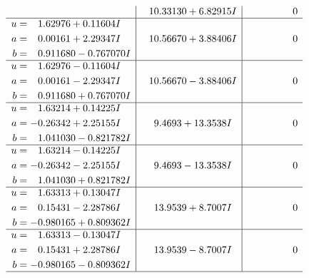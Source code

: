 \documentclass[1p]{elsarticle_modified}
\theoremstyle{definition}
\begin{document}
$$\begin{array}{c|c|c}
 & \phantom{-}10.33130 + 6.82915 I & \phantom{-0.000000 } 0 \\ \hline\begin{aligned}
u &= \phantom{-}1.62976 + 0.11604 I \\
a &= \phantom{-}0.00161 + 2.29347 I \\
b &= \phantom{-}0.911680 - 0.767070 I\end{aligned}
 & \phantom{-}10.56670 + 3.88406 I & \phantom{-0.000000 } 0 \\ \hline\begin{aligned}
u &= \phantom{-}1.62976 - 0.11604 I \\
a &= \phantom{-}0.00161 - 2.29347 I \\
b &= \phantom{-}0.911680 + 0.767070 I\end{aligned}
 & \phantom{-}10.56670 - 3.88406 I & \phantom{-0.000000 } 0 \\ \hline\begin{aligned}
u &= \phantom{-}1.63214 + 0.14225 I \\
a &= -0.26342 + 2.25155 I \\
b &= \phantom{-}1.041030 - 0.821782 I\end{aligned}
 & \phantom{-}9.4693 + 13.3538 I & \phantom{-0.000000 } 0 \\ \hline\begin{aligned}
u &= \phantom{-}1.63214 - 0.14225 I \\
a &= -0.26342 - 2.25155 I \\
b &= \phantom{-}1.041030 + 0.821782 I\end{aligned}
 & \phantom{-}9.4693 - 13.3538 I & \phantom{-0.000000 } 0 \\ \hline\begin{aligned}
u &= \phantom{-}1.63313 + 0.13047 I \\
a &= \phantom{-}0.15431 - 2.28786 I \\
b &= -0.980165 + 0.809362 I\end{aligned}
 & \phantom{-}13.9539 + 8.7007 I & \phantom{-0.000000 } 0 \\ \hline\begin{aligned}
u &= \phantom{-}1.63313 - 0.13047 I \\
a &= \phantom{-}0.15431 + 2.28786 I \\
b &= -0.980165 - 0.809362 I\end{aligned}
 & \phantom{-}13.9539 - 8.7007 I & \phantom{-0.000000 } 0\\
 \hline 
 \end{array}$$\newpage$$\begin{array}{c|c|c}  

\end{array}$$
\end{document}

